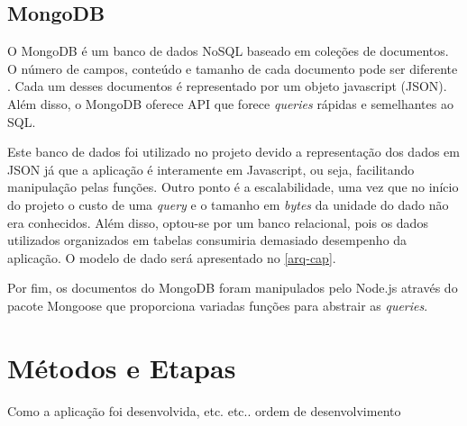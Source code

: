 \subsection{MongoDB}
O MongoDB é um banco de dados NoSQL baseado em coleções de documentos. O número de campos, conteúdo e tamanho de cada documento pode ser
diferente \cite{mongo}. Cada um desses documentos é representado por um objeto javascript (JSON). Além disso, o MongoDB oferece API que forece \emph{queries} rápidas e semelhantes ao SQL.

Este banco de dados foi utilizado no projeto devido a representação dos dados em
JSON já que a aplicação é interamente em Javascript, ou seja, facilitando
manipulação pelas funções. Outro ponto é a escalabilidade, uma vez que no início
do projeto o custo de uma \emph{query} e o tamanho em \emph{bytes} da unidade do
dado não era conhecidos. Além disso, optou-se por um banco relacional, pois os dados utilizados organizados em tabelas
consumiria demasiado desempenho da aplicação. O modelo de dado será apresentado no \autoref{arq-cap}.

Por fim, os documentos do MongoDB foram manipulados pelo Node.js através do pacote Mongoose que proporciona variadas
funções para abstrair as \emph{queries}.

\section{Métodos e Etapas}
Como a aplicação foi desenvolvida, etc. etc.. ordem de desenvolvimento
